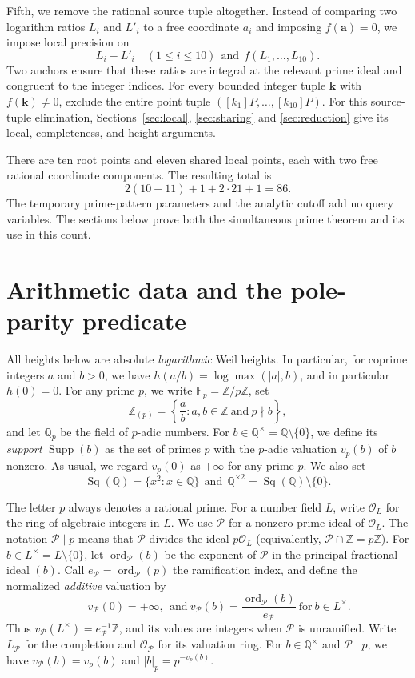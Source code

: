 \documentclass[11pt,reqno]{amsart}
\theoremstyle{definition}
\numberwithin{equation}{section}
\newcommand{\Q}{\mathbb Q}
\newcommand{\Z}{\mathbb Z}
\newcommand{\F}{\mathbb F}
\newcommand{\OO}{\mathcal O}
\newcommand{\Sq}{\operatorname{Sq}}
\newcommand{\Supp}{\operatorname{Supp}}
\def\l{\left}
\def\r{\right}
\def\t{\text}
\def\f{\frac}
\def\sm{\setminus}
\begin{document}
Fifth, we remove the rational source tuple altogether. Instead of comparing two logarithm ratios $L_i$ and $L'_i$ to a free coordinate $a_i$ and imposing $f(\mathbf a)=0$, we impose local precision on
\[
 L_i-L'_i\quad(1\le i\le10)\ \ \t{and}\ \ f(L_1,\ldots,L_{10}).
\]
Two anchors ensure that these ratios are integral at the relevant prime ideal and congruent to the integer indices. For every bounded integer tuple $\mathbf k$ with $f(\mathbf k)\ne0$, exclude the entire point tuple $([k_1]P,\ldots,[k_{10}]P)$. For this source-tuple elimination, Sections~\ref{sec:local}, \ref{sec:sharing} and \ref{sec:reduction} give its local, completeness, and height arguments. 

There are ten root points and eleven shared local points, each with two free rational coordinate components. The resulting total is
\begin{equation}\label{eq:introcount}
 2(10+11)+1+2\cdot21+1=86.
\end{equation}
The temporary prime-pattern parameters and the analytic cutoff add no query variables. The sections below prove both the simultaneous prime theorem and its use in this count.

\section{Arithmetic data and the pole-parity predicate}\label{sec:inputs}

All heights below are absolute \emph{logarithmic} Weil heights. In particular, for coprime integers $a$ and $b>0$, we have $h(a/b)=\log\max(|a|,b)$, and in particular $h(0)=0$. 
For any prime $p$, we write $\F_p=\Z/p\Z$, set
$$\Z_{(p)}=\l\{\f ab:a,b\in\Z\ \t{and}\ p\nmid b\r\},$$
 and let $\Q_p$ be the field of $p$-adic numbers. 
   For $b\in\Q^\times=\Q\sm\{0\}$, we define its {\it support} 
$\Supp(b)$ as the set of primes $p$ with the $p$-adic valuation $v_p(b)$ of $b$ nonzero. 
As usual, we regard $v_p(0)$ as $+\infty$ for any prime $p$. We also set
  $$\Sq(\Q)=\{x^2:x\in\Q\}\ \ \t{and}\ \ \Q^{\times2}=\Sq(\Q)\setminus\{0\}.$$

The letter $p$ always denotes a rational prime. For a number field $L$, write $\OO_L$ for the ring of algebraic integers in $L$. We use $\mathcal P$ for a nonzero prime ideal of $\OO_L$. The notation $\mathcal P\mid p$ means that $\mathcal P$ divides the ideal $p\OO_L$ (equivalently, $\mathcal P\cap\Z=p\Z$). For $b\in L^\times=L\sm\{0\}$, let $\operatorname{ord}_{\mathcal P}(b)$ be the exponent of $\mathcal P$ in the principal fractional ideal $(b)$. Call $e_{\mathcal P}=\operatorname{ord}_{\mathcal P}(p)$ the ramification index, and define the normalized \emph{additive} valuation by
\[\qquad v_{\mathcal P}(0)=+\infty,
\ \ \t{and}\
 v_{\mathcal P}(b)=\frac{\operatorname{ord}_{\mathcal P}(b)}{e_{\mathcal P}} \ \t{for}\ b\in L^\times. 
\]
Thus $v_{\mathcal P}(L^\times)=e_{\mathcal P}^{-1}\Z$, and its values are integers when $\mathcal P$ is unramified. Write $L_{\mathcal P}$ for the completion and $\OO_{\mathcal P}$ for its valuation ring. 
For $b\in\Q^\times$ and $\mathcal P\mid p$, we have $v_{\mathcal P}(b)=v_p(b)$ and $|b|_p=p^{-v_p(b)}$. 
\end{document}
